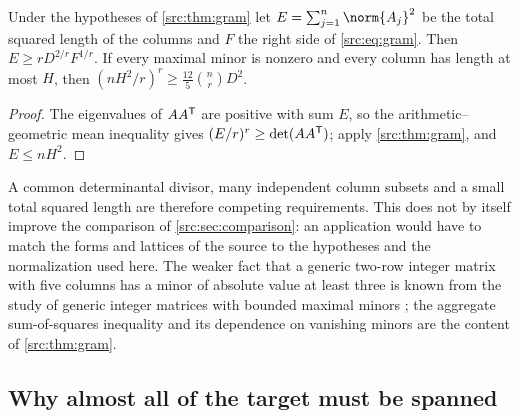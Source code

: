 \begin{corollary}\label{src:cor:gram}
Under the hypotheses of \cref{src:thm:gram} let $E=\sum_{j=1}^n\norm{A_j}^2$ be the total
squared length of the columns and $F$ the right side of \eqref{src:eq:gram}. Then
$E\ge rD^{2/r}F^{1/r}$. If every maximal minor is nonzero and every column has length at most
$H$, then $(nH^2/r)^r\ge\tfrac{12}5\binom nrD^2$.
\end{corollary}

\begin{proof}
The eigenvalues of $AA^{\mathsf{T}}$ are positive with sum $E$, so the arithmetic--geometric mean
inequality gives $(E/r)^r\ge\det(AA^{\mathsf{T}})$; apply \cref{src:thm:gram}, and $E\le nH^2$.
\end{proof}

A common determinantal divisor, many independent column subsets and a small total squared
length are therefore competing requirements. This does not by itself improve the comparison of
\cref{src:sec:comparison}: an application would have to match the forms and lattices of the
source to the hypotheses and the normalization used here. The weaker fact that a generic
two-row integer matrix with five columns has a minor of absolute value at least three is known
from the study of generic integer matrices with bounded maximal minors
\cite{KriepkeKyureghyanSchymura2023Size,KriepkeSchymura2025Generic}; the aggregate
sum-of-squares inequality and its dependence on vanishing minors are the content of
\cref{src:thm:gram}.

\subsection{Why almost all of the target must be spanned}\label{src:sec:span}
\begingroup\raggedright
{}
\endgroup


